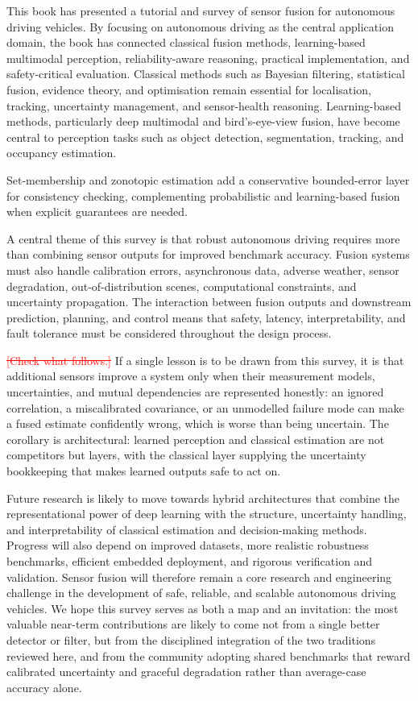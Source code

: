\documentclass[11pt,oneside,openany]{book}
\newcommand{\added}[1]{\textcolor{RevisionBlue}{#1}}
\newcommand{\deleted}[1]{\textcolor{red}{\sout{#1}}}
\begin{document}
This book has presented a tutorial and survey of sensor fusion for autonomous driving vehicles. By focusing on autonomous driving as the central application domain, the book has connected classical fusion methods, learning-based multimodal perception, reliability-aware reasoning, practical implementation, and safety-critical evaluation. Classical methods such as Bayesian filtering, statistical fusion, evidence theory, and optimisation remain essential for localisation, tracking, uncertainty management, and sensor-health reasoning. Learning-based methods, particularly deep multimodal and bird's-eye-view fusion, have become central to perception tasks such as object detection, segmentation, tracking, and occupancy estimation.

Set-membership and zonotopic estimation add a conservative bounded-error layer for consistency checking, complementing probabilistic and learning-based fusion when explicit guarantees are needed.

A central theme of this survey is that robust autonomous driving requires more than combining sensor outputs for improved benchmark accuracy. Fusion systems must also handle calibration errors, asynchronous data, adverse weather, sensor degradation, out-of-distribution scenes, computational constraints, and uncertainty propagation. The interaction between fusion outputs and downstream prediction, planning, and control means that safety, latency, interpretability, and fault tolerance must be considered throughout the design process.

\deleted{[Check what follows.]} %
\added{If a single lesson is to be drawn from this survey, it is that additional sensors improve a system only when their measurement models, uncertainties, and mutual dependencies are represented honestly: an ignored correlation, a miscalibrated covariance, or an unmodelled failure mode can make a fused estimate confidently wrong, which is worse than being uncertain. The corollary is architectural: learned perception and classical estimation are not competitors but layers, with the classical layer supplying the uncertainty bookkeeping that makes learned outputs safe to act on.}

Future research is likely to move towards hybrid architectures that combine the representational power of deep learning with the structure, uncertainty handling, and interpretability of classical estimation and decision-making methods. Progress will also depend on improved datasets, more realistic robustness benchmarks, efficient embedded deployment, and rigorous verification and validation. Sensor fusion will therefore remain a core research and engineering challenge in the development of safe, reliable, and scalable autonomous driving vehicles. %
\added{We hope this survey serves as both a map and an invitation: the most valuable near-term contributions are likely to come not from a single better detector or filter, but from the disciplined integration of the two traditions reviewed here, and from the community adopting shared benchmarks that reward calibrated uncertainty and graceful degradation rather than average-case accuracy alone.}
\end{document}
